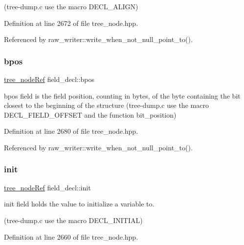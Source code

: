 (tree-\/dump.\+c use the macro D\+E\+C\+L\+\_\+\+A\+L\+I\+GN) 

Definition at line 2672 of file tree\+\_\+node.\+hpp.



Referenced by raw\+\_\+writer\+::write\+\_\+when\+\_\+not\+\_\+null\+\_\+point\+\_\+to().

\mbox{\label{structfield__decl_a760e5edb341b17cc94020320795d9fe8}} 
\subsubsection{\texorpdfstring{bpos}{bpos}}
{\footnotesize\ttfamily \hyperlink{tree__node_8hpp_a6ee377554d1c4871ad66a337eaa67fd5}{tree\+\_\+node\+Ref} field\+\_\+decl\+::bpos}



bpos field is the field position, counting in bytes, of the byte containing the bit closest to the beginning of the structure (tree-\/dump.\+c use the macro D\+E\+C\+L\+\_\+\+F\+I\+E\+L\+D\+\_\+\+O\+F\+F\+S\+ET and the function bit\+\_\+position) 



Definition at line 2680 of file tree\+\_\+node.\+hpp.



Referenced by raw\+\_\+writer\+::write\+\_\+when\+\_\+not\+\_\+null\+\_\+point\+\_\+to().

\mbox{\label{structfield__decl_afce91d65257d42bf92aba9f205586832}} 
\subsubsection{\texorpdfstring{init}{init}}
{\footnotesize\ttfamily \hyperlink{tree__node_8hpp_a6ee377554d1c4871ad66a337eaa67fd5}{tree\+\_\+node\+Ref} field\+\_\+decl\+::init}



init field holds the value to initialize a variable to. 

(tree-\/dump.\+c use the macro D\+E\+C\+L\+\_\+\+I\+N\+I\+T\+I\+AL) 

Definition at line 2660 of file tree\+\_\+node.\+hpp.



